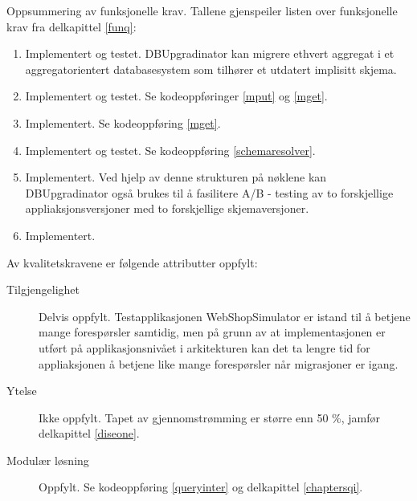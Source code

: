 Oppsummering av funksjonelle krav. Tallene gjenspeiler listen over funksjonelle krav fra delkapittel \ref{funq}:

\begin{enumerate}
  \item Implementert og testet. DBUpgradinator kan migrere ethvert aggregat i et aggregatorientert databasesystem som tilhører et utdatert implisitt skjema.
  \item Implementert og testet. Se kodeoppføringer \ref{mput} og \ref{mget}.
  \item Implementert. Se kodeoppføring \ref{mget}.
  \item Implementert og testet. Se kodeoppføring \ref{schemaresolver}.
  \item Implementert. Ved hjelp av denne strukturen på nøklene kan DBUpgradinator også brukes til å fasilitere A/B - testing av to forskjellige appliaksjonsversjoner med to forskjellige skjemaversjoner.
  \item Implementert.
\end{enumerate}

Av kvalitetskravene er følgende attributter oppfylt:

\begin{description}
  \item[Tilgjengelighet] Delvis oppfylt. Testapplikasjonen WebShopSimulator er istand til å betjene mange forespørsler samtidig, men på grunn av at implementasjonen er utført på applikasjonsnivået i arkitekturen kan det ta lengre tid for appliaksjonen å betjene like mange forespørsler når migrasjoner er igang.
  \item[Ytelse] Ikke oppfylt. Tapet av gjennomstrømming er større enn 50 \%, jamfør delkapittel \ref{diseone}.
  \item[Modulær løsning] Oppfylt. Se kodeoppføring \ref{queryinter} og delkapittel \ref{chaptersqi}.
\end{description}

